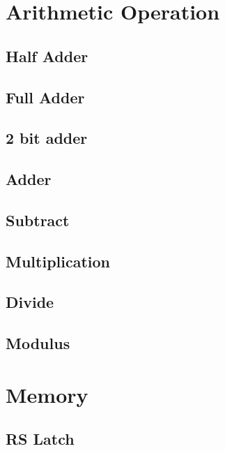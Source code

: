 \documentclass[a4paper, 12pt]{article}
\begin{document}
\section{Arithmetic Operation}
\subsection{Half Adder}
\subsection{Full Adder}
\subsection{2 bit adder}
\subsection{Adder}
\subsection{Subtract}
\subsection{Multiplication}
\subsection{Divide}
\subsection{Modulus}

\section{Memory}

\subsection{RS Latch}
\end{document}
